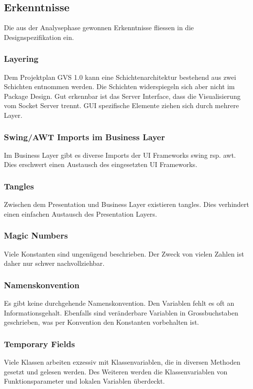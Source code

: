 \documentclass[11pt,a4paper,english,oneside]{book}
\numberwithin{equation}{chapter}
\begin{document}
	\subsection{Erkenntnisse} \label{sec:erkenntnisse}
	Die aus der Analysephase gewonnen Erkenntnisse fliessen in die Designspezifikation ein.
		
	\subsubsection{Layering}
	Dem Projektplan GVS 1.0 \cite{gvs1} kann eine Schichtenarchitektur bestehend aus zwei Schichten entnommen werden. Die Schichten widerspiegeln sich aber nicht im Package Design. Gut erkennbar ist das Server Interface, dass die Visualisierung vom Socket Server trennt. GUI spezifische Elemente ziehen sich durch mehrere Layer.
	
	\subsubsection{Swing/AWT Imports im Business Layer} 
	Im Business Layer gibt es diverse Imports der UI Frameworks \gls{swing} rsp. \gls{awt}. Dies erschwert einen Austausch des eingesetzten UI Frameworks.
	
	\subsubsection{Tangles} Zwischen dem Presentation und Business Layer existieren \gls{tangle}s. Dies verhindert einen einfachen Austausch des Presentation Layers. 
	
	\subsubsection{Magic Numbers} Viele Konstanten sind ungenügend beschrieben. Der Zweck von vielen Zahlen ist daher nur schwer nachvollziehbar.
	
	\subsubsection{Namenskonvention}
	Es gibt keine durchgehende Namenskonvention. Den Variablen fehlt es oft an Informationsgehalt. Ebenfalls sind veränderbare Variablen in Grossbuchstaben geschrieben, was per Konvention \cite{jls-naming} den Konstanten vorbehalten ist.
	
	\subsubsection{Temporary Fields}
	Viele Klassen arbeiten exzessiv mit Klassenvariablen, die in diversen Methoden gesetzt und gelesen werden. Des Weiteren werden die Klassenvariablen von Funktionsparameter und lokalen Variablen überdeckt.   
	
\end{document}
